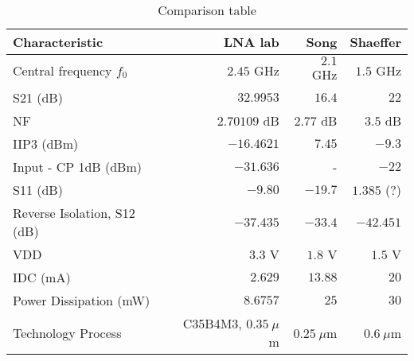 \begin{table}[H] \centering
   \begin{tabular}{ |l|r|r|r| } \hline
       Characteristic & LNA lab & Song & Shaeffer \\ \hline \hline
       Central frequency $f_0$ & $2.45$ GHz & $2.1$ GHz & $1.5$ GHz \\ \hline %
       S21 (dB) & $32.9953$ & $16.4$ & $22$  \\ \hline %
       NF & $2.70109$ dB & $2.77$ dB & $3.5$ dB \\ \hline
       IIP3 (dBm) & $-16.4621$ & $7.45$ & $-9.3$ \\ \hline
       Input - CP 1dB (dBm) & $-31.636$ & - & $-22$  \\ \hline
       S11 (dB) &  $-9.80$ & $-19.7$ & $1.385$ (?) \\ \hline
       Reverse Isolation, S12 (dB) & $-37.435$ & $-33.4$ & $-42.451$  \\ \hline
       VDD & $3.3$ V & $1.8$ V & $1.5$ V \\ \hline
       IDC (mA) & $2.629$ & $13.88$ & $20$  \\ \hline
       Power Dissipation (mW) & $8.6757$ & $25$ & $30$  \\ \hline
       Technology Process & C35B4M3, $0.35 \ \mu$m & $0.25 \ \mu$m & $0.6 \ \mu$m  \\ \hline
   \end{tabular}
   \caption{Comparison table}
\end{table}

